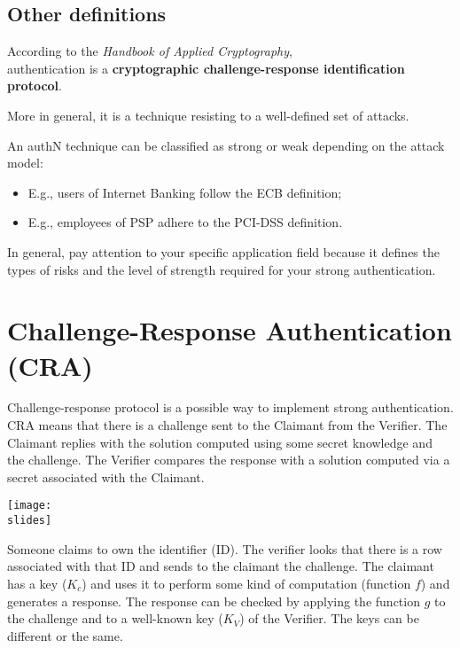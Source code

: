 \subsection{Other definitions}
According to the \textit{Handbook of Applied Cryptography},\\
authentication is a \textbf{cryptographic challenge-response identification protocol}.

More in general, it is a technique resisting to a well-defined set of attacks.

An authN technique can be classified as strong or weak depending on the attack model:
\begin{itemize}
  \item E.g., users of Internet Banking follow the ECB definition;
  \item E.g., employees of PSP adhere to the PCI-DSS definition.
\end{itemize}

In general, pay attention to your specific application field because it defines the types of risks and the level of strength required for your strong authentication.




\section{Challenge-Response Authentication (CRA)}
Challenge-response protocol is a possible way to implement strong authentication. CRA means that there is a
challenge sent to the Claimant from the Verifier. The Claimant replies with the solution computed using some
secret knowledge and the challenge. The Verifier compares the response with a solution computed via a secret
associated with the Claimant.


\vspace{2mm}
\noindent
\begin{minipage}{0.5\textwidth}
  \centering
  \texttt{[image: \\slides]}
\end{minipage}
\hspace{0.05\textwidth}
\begin{minipage}{0.4\textwidth}
  Someone claims to own the identifier (ID). The verifier looks that there is a row
  associated with that ID and sends to the
  claimant the challenge. The claimant has
  a key (\(K_c\)) and uses it to perform some
  kind of computation (function \(f\)) and
  generates a response. The response can
  be checked by applying the function \(g\) to
  the challenge and to a well-known key (\(K_V\)) of the Verifier. The keys can be different or the same.
\end{minipage}


